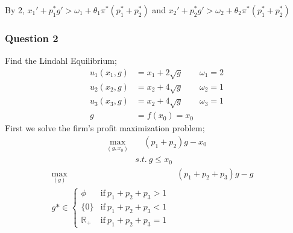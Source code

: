 \documentclass[12pt,a4paper]{article}
\begin{document}
By 2, \(x_{1}'+p_{1}^*g' > \omega_{1} + \theta_{1}\pi^*(p_{1}^*+p_{2}^*)\) and \(x_{2}' +p_{2}^*g' > \omega_{2} + \theta_{2}\pi^*(p_{1}^*+p_{2}^*)\) 
\pagebreak

\subsubsection*{Question 2}
Find the Lindahl Equilibrium;
  \begin{align*}
     u_{1}(x_{1},g)&= x_{1}+2\sqrt{g} \qquad \omega_{1}=2\\
     u_{2}(x_{2},g)&= x_{2}+4\sqrt{g} \qquad \omega_{2}=1\\
     u_{3}(x_{3},g)&= x_{2}+4\sqrt{g} \qquad \omega_{3}=1\\
     g&=f(x_{0})=x_{0}
\end{align*}
First we solve the firm's profit maximization problem;
     \begin{align*}
           \max_{(g,x_{0})} & \quad (p_{1}+p_{2})g-x_{0} \\
           &s.t. \ g \leq x_{0}
    \end{align*}
     \begin{align*}
           \max_{(g)} & (p_{1}+p_{2}+p_{3})g-g \quad  \\
           g* \in \begin{cases} \phi & \text{if} \ p_{1}+p_{2}+p_{3} > 1\\
            \{0\} & \text{if} \ p_{1}+p_{2}+p_{3} <1\\
            \mathbb{R}_{+} & \text{if} \ p_{1}+p_{2}+p_{3}=1
        \end{cases}
    \end{align*}
\end{document}
